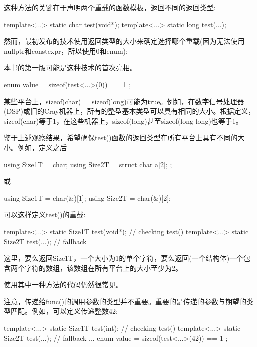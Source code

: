 这种方法的关键在于声明两个重载的函数模板，返回不同的返回类型:

\begin{cpp}
template<...> static char test(void*);
template<...> static long test(...);
\end{cpp}

然而，最初发布的技术使用返回类型的大小来确定选择哪个重载(因为无法使用nullptr和constexpr，所以使用0和enum):

\begin{notice}本书的第一版可能是这种技术的首次亮相。
\end{notice}

\begin{cpp}
enum { value = sizeof(test<...>(0)) == 1 };
\end{cpp}

某些平台上，sizeof(char)==sizeof(long)可能为true。例如，在数字信号处理器(DSP)或旧的Cray机器上，所有的整型基本类型可以具有相同的大小。根据定义，sizeof(char)等于1，在这些机器上，sizeof(long)甚至sizeof(long long)也等于1。

鉴于上述观察结果，希望确保test()函数的返回类型在所有平台上具有不同的大小。例如，定义之后

\begin{cpp}
using Size1T = char;
using Size2T = struct { char a[2]; };
\end{cpp}

或

\begin{cpp}
using Size1T = char(&)[1];
using Size2T = char(&)[2];
\end{cpp}

可以这样定义test()的重载:

\begin{cpp}
template<...> static Size1T test(void*); // checking test()
template<...> static Size2T test(...); // fallback
\end{cpp}

这里，要么返回Size1T，一个大小为1的单个字符，要么返回(一个结构体)一个包含两个字符的数组，该数组在所有平台上的大小至少为2。

使用其中一种方法的代码仍然很常见。

注意，传递给func()的调用参数的类型并不重要。重要的是传递的参数与期望的类型匹配。例如，可以定义传递整数42:

\begin{cpp}
template<...> static Size1T test(int); // checking test()
template<...> static Size2T test(...); // fallback
...
enum { value = sizeof(test<...>(42)) == 1 };
\end{cpp}

